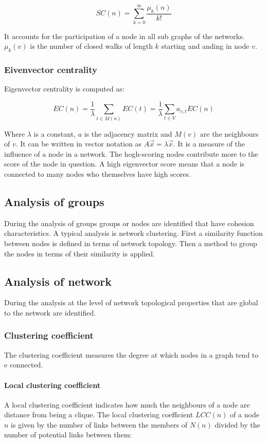 		$$SC(n) = \sum\limits_{k=0}^\infty \frac{\mu_k(n)}{k!}$$

		It accounts for the participation of a node in all sub graphs of the networks.
		$\mu_k(v)$ is the number of closed walks of length $k$ starting and anding in node $v$.

		\subsubsection{Eivenvector centrality}
		Eigenvector centrality is computed as:

		$$EC(n) = \frac{1}{\lambda}\sum\limits_{t\in M(n)} EC(t) = \frac{1}{\lambda}\sum\limits_{t\in V} a_{v,t}EC(n)$$

		Where $\lambda$ is a constant, $a$ is the adjacency matrix and $M(v)$ are the neighbours of $v$.
		It can be written in vector notation as $A\vec{x} = \lambda\vec{x}$.
		It is a measure of the influence of a node in a network.
		The hogh-scoring nodes contribute more to the score of the node in question.
		A high eigenvector score means that a node is connected to many nodes who themselves have high scores.

	\subsection{Analysis of groups}
	During the analysis of groups groups or nodes are identified that have cohesion characteristics.
	A typical analysis is network clustering.
	First a similarity function between nodes is defined in terms of network topology.
	Then a method to group the nodes in terms of their similarity is applied.

	\subsection{Analysis of network}
	During the analysis at the level of network topological properties that are global to the network are identified.

		\subsubsection{Clustering coefficient}
		The clustering coefficient measures the degree at which nodes in a graph tend to e connected.

			\paragraph{Local clustering coefficient}
			A local clustering coefficient indicates how much the neighbours of a node are distance from being a clique.
			The local clustering coefficient $LCC(n)$ of a node $n$ is given by the number of links between the members of $N(n)$ divided by the number of potential links between them:

